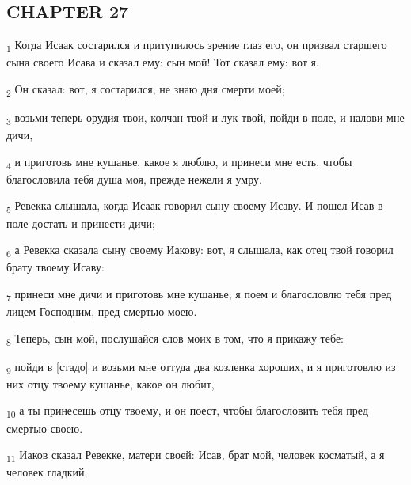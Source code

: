 \subsection{CHAPTER 27}
\begin{tcolorbox}
\textsubscript{1} Когда Исаак состарился и притупилось зрение глаз его, он призвал старшего сына своего Исава и сказал ему: сын мой! Тот сказал ему: вот я.
\end{tcolorbox}
\begin{tcolorbox}
\textsubscript{2} Он сказал: вот, я состарился; не знаю дня смерти моей;
\end{tcolorbox}
\begin{tcolorbox}
\textsubscript{3} возьми теперь орудия твои, колчан твой и лук твой, пойди в поле, и налови мне дичи,
\end{tcolorbox}
\begin{tcolorbox}
\textsubscript{4} и приготовь мне кушанье, какое я люблю, и принеси мне есть, чтобы благословила тебя душа моя, прежде нежели я умру.
\end{tcolorbox}
\begin{tcolorbox}
\textsubscript{5} Ревекка слышала, когда Исаак говорил сыну своему Исаву. И пошел Исав в поле достать и принести дичи;
\end{tcolorbox}
\begin{tcolorbox}
\textsubscript{6} а Ревекка сказала сыну своему Иакову: вот, я слышала, как отец твой говорил брату твоему Исаву:
\end{tcolorbox}
\begin{tcolorbox}
\textsubscript{7} принеси мне дичи и приготовь мне кушанье; я поем и благословлю тебя пред лицем Господним, пред смертью моею.
\end{tcolorbox}
\begin{tcolorbox}
\textsubscript{8} Теперь, сын мой, послушайся слов моих в том, что я прикажу тебе:
\end{tcolorbox}
\begin{tcolorbox}
\textsubscript{9} пойди в [стадо] и возьми мне оттуда два козленка хороших, и я приготовлю из них отцу твоему кушанье, какое он любит,
\end{tcolorbox}
\begin{tcolorbox}
\textsubscript{10} а ты принесешь отцу твоему, и он поест, чтобы благословить тебя пред смертью своею.
\end{tcolorbox}
\begin{tcolorbox}
\textsubscript{11} Иаков сказал Ревекке, матери своей: Исав, брат мой, человек косматый, а я человек гладкий;
\end{tcolorbox}
